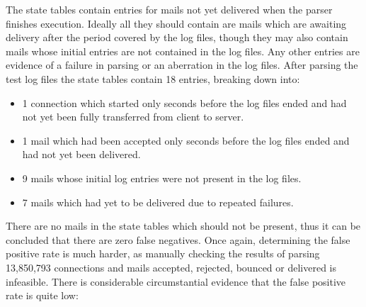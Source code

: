 The state tables contain entries for mails not yet delivered when the
parser finishes execution.  Ideally all they should contain are mails which
are awaiting delivery after the period covered by the log files, though
they may also contain mails whose initial entries are not contained in the
log files.  Any other entries are evidence of a failure in parsing or an
aberration in the log files.  After parsing the \numberOFlogFILES{} test
log files the state tables contain 18 entries, breaking down into:

\begin{itemize}

    \item 1 connection which started only seconds before the log files
        ended and had not yet been fully transferred from client to server.

    \item 1 mail which had been accepted only seconds before the log files
        ended and had not yet been delivered.

    \item 9 mails whose initial log entries were not present in the log
        files.

    \item 7 mails which had yet to be delivered due to repeated failures.

\end{itemize}

There are no mails in the state tables which should not be present, thus it
can be concluded that there are zero false negatives.  Once again,
determining the false positive rate is much harder, as manually checking
the results of parsing 13,850,793 connections and mails accepted, rejected,
bounced or delivered is infeasible.  There is considerable circumstantial
evidence that the false positive rate is quite low:

